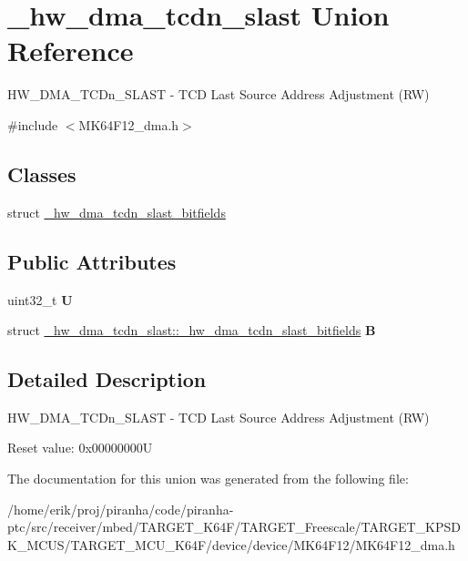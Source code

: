 \hypertarget{union__hw__dma__tcdn__slast}{}\section{\+\_\+hw\+\_\+dma\+\_\+tcdn\+\_\+slast Union Reference}
\label{union__hw__dma__tcdn__slast}


H\+W\+\_\+\+D\+M\+A\+\_\+\+T\+C\+Dn\+\_\+\+S\+L\+A\+ST -\/ T\+CD Last Source Address Adjustment (RW)  




{\ttfamily \#include $<$M\+K64\+F12\+\_\+dma.\+h$>$}

\subsection*{Classes}
\begin{DoxyCompactItemize}
\item 
struct \hyperlink{struct__hw__dma__tcdn__slast_1_1__hw__dma__tcdn__slast__bitfields}{\+\_\+hw\+\_\+dma\+\_\+tcdn\+\_\+slast\+\_\+bitfields}
\end{DoxyCompactItemize}
\subsection*{Public Attributes}
\begin{DoxyCompactItemize}
\item 
uint32\+\_\+t {\bfseries U}\hypertarget{union__hw__dma__tcdn__slast_ad06878c1d59a69596fe95bebdfb039d6}{}\label{union__hw__dma__tcdn__slast_ad06878c1d59a69596fe95bebdfb039d6}

\item 
struct \hyperlink{struct__hw__dma__tcdn__slast_1_1__hw__dma__tcdn__slast__bitfields}{\+\_\+hw\+\_\+dma\+\_\+tcdn\+\_\+slast\+::\+\_\+hw\+\_\+dma\+\_\+tcdn\+\_\+slast\+\_\+bitfields} {\bfseries B}\hypertarget{union__hw__dma__tcdn__slast_aa8bdc719ddd647006192a3c28a060406}{}\label{union__hw__dma__tcdn__slast_aa8bdc719ddd647006192a3c28a060406}

\end{DoxyCompactItemize}


\subsection{Detailed Description}
H\+W\+\_\+\+D\+M\+A\+\_\+\+T\+C\+Dn\+\_\+\+S\+L\+A\+ST -\/ T\+CD Last Source Address Adjustment (RW) 

Reset value\+: 0x00000000U 

The documentation for this union was generated from the following file\+:\begin{DoxyCompactItemize}
\item 
/home/erik/proj/piranha/code/piranha-\/ptc/src/receiver/mbed/\+T\+A\+R\+G\+E\+T\+\_\+\+K64\+F/\+T\+A\+R\+G\+E\+T\+\_\+\+Freescale/\+T\+A\+R\+G\+E\+T\+\_\+\+K\+P\+S\+D\+K\+\_\+\+M\+C\+U\+S/\+T\+A\+R\+G\+E\+T\+\_\+\+M\+C\+U\+\_\+\+K64\+F/device/device/\+M\+K64\+F12/M\+K64\+F12\+\_\+dma.\+h\end{DoxyCompactItemize}
